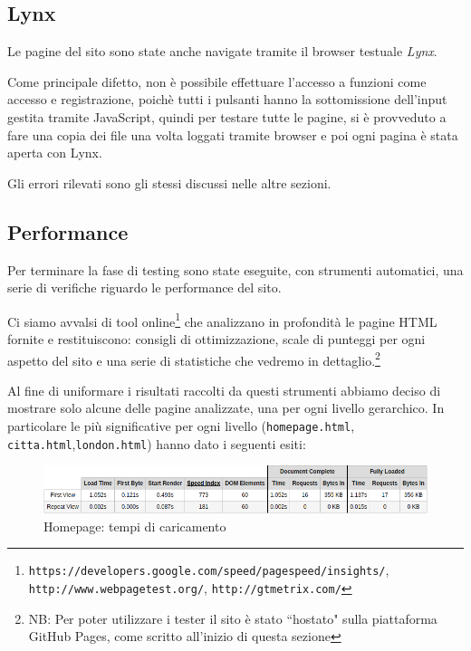 \subsection{Lynx}\label{sec:lynx} %
Le pagine del sito sono state anche navigate tramite il browser testuale
\textit{Lynx}.

Come principale difetto, non è possibile effettuare l'accesso a funzioni come
accesso e registrazione, poichè tutti i pulsanti hanno la sottomissione
dell'input gestita tramite JavaScript, quindi per testare tutte le pagine, si è
provveduto a fare una copia dei file una volta loggati tramite browser e poi
ogni pagina è stata aperta con Lynx.

Gli errori rilevati sono gli stessi discussi nelle altre sezioni.

\subsection{Performance}
Per terminare la fase di testing sono state eseguite, con strumenti
automatici, una serie di verifiche riguardo le performance del sito.

Ci siamo avvalsi di tool online\footnote{\texttt{https://developers.google.com/speed/pagespeed/insights/}, \texttt{http://www.webpagetest.org/},
\texttt{http://gtmetrix.com/}} che analizzano in profondità le pagine HTML
fornite e restituiscono: consigli di ottimizzazione, scale di punteggi per ogni
aspetto del sito e una serie di statistiche che vedremo in dettaglio.\footnote{NB: Per poter utilizzare i tester il sito è stato ``hostato" sulla piattaforma GitHub Pages, come scritto all'inizio di questa sezione}

Al fine di uniformare i risultati raccolti da questi strumenti abbiamo deciso
di mostrare solo alcune delle pagine analizzate, una per ogni livello
gerarchico.
In particolare le più significative per ogni livello (\texttt{homepage.html},
\texttt{citta.html},\texttt{london.html}) hanno dato i seguenti esiti:

\begin{figure}[h]
\includegraphics[width=\linewidth]{images/performance/webpagetest/home.png}
\caption{Homepage: tempi di caricamento}
\label{fig:tempiHome}
\end{figure}

